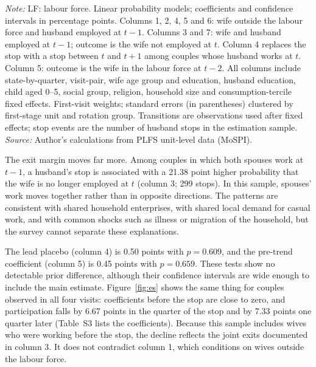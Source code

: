 \begin{table}[htbp]
\centering
\caption{Wives' transitions when the husband stops working}
\label{tab:main}
\scriptsize
\setlength{\tabcolsep}{3pt}
\begin{minipage}{\linewidth}\footnotesize\vspace{4pt}
\textit{Note:} LF: labour force. Linear probability models; coefficients and confidence intervals in percentage points. Columns 1, 2, 4, 5 and 6: wife outside the labour force and husband employed at $t-1$. Columns 3 and 7: wife and husband employed at $t-1$; outcome is the wife not employed at $t$. Column 4 replaces the stop with a stop between $t$ and $t+1$ among couples whose husband works at $t$. Column 5: outcome is the wife in the labour force at $t-2$. All columns include state-by-quarter, visit-pair, wife age group and education, husband education, child aged 0--5, social group, religion, household size and consumption-tercile fixed effects. First-visit weights; standard errors (in parentheses) clustered by first-stage unit and rotation group. Transitions are observations used after fixed effects; stop events are the number of husband stops in the estimation sample.\\
\textit{Source:} Author's calculations from PLFS unit-level data (MoSPI).
\end{minipage}
\end{table}

The exit margin moves far more. Among couples in which both spouses work at $t-1$, a husband's stop is associated with a 21.38 point higher probability that the wife is no longer employed at $t$ (column 3; 299 stops). In this sample, spouses' work moves together rather than in opposite directions. The patterns are consistent with shared household enterprises, with shared local demand for casual work, and with common shocks such as illness or migration of the household, but the survey cannot separate these explanations.

The lead placebo (column 4) is 0.50 points with $p=0.609$, and the pre-trend coefficient (column 5) is 0.45 points with $p=0.659$. These tests show no detectable prior difference, although their confidence intervals are wide enough to include the main estimate. Figure~\ref{fig:es} shows the same thing for couples observed in all four visits: coefficients before the stop are close to zero, and participation falls by 6.67 points in the quarter of the stop and by 7.33 points one quarter later (Table~S3 lists the coefficients). Because this sample includes wives who were working before the stop, the decline reflects the joint exits documented in column 3. It does not contradict column 1, which conditions on wives outside the labour force.

